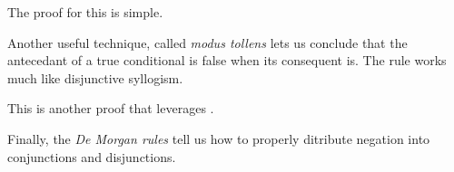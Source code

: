 The proof for this is simple.

\begin{fitchproof}
   {\enot\enot\ephi} 
  \open
   {\enot\ephi}      
   {\ebot}           
  \close
   {\ephi}           
\end{fitchproof}

Another useful technique, called \emph{modus tollens} lets us conclude that
the antecedant of a true conditional is false when its consequent is. The
rule works much like disjunctive syllogism.

\begin{fitchrule}
  \label{def:modus-tollens-rule}
  \leavevmode
  \vspace{-0.9\baselineskip}
  \begin{fitchproof}
     {\ephi\eif\epsi}
     {\enot\epsi}
     {\enot\ephi}     
  \end{fitchproof}
\end{fitchrule}

This is another proof that leverages \ebot.

\begin{fitchproof}
   {\ephi\eif\epsi}  
   {\enot\epsi}      
  \open
   {\ephi}           
   {\epsi}           
   {\ebot}           
  \close
   {\enot\ephi}      
\end{fitchproof}

Finally, the \emph{De Morgan rules} tell us how to properly ditribute negation
into conjunctions and disjunctions.

